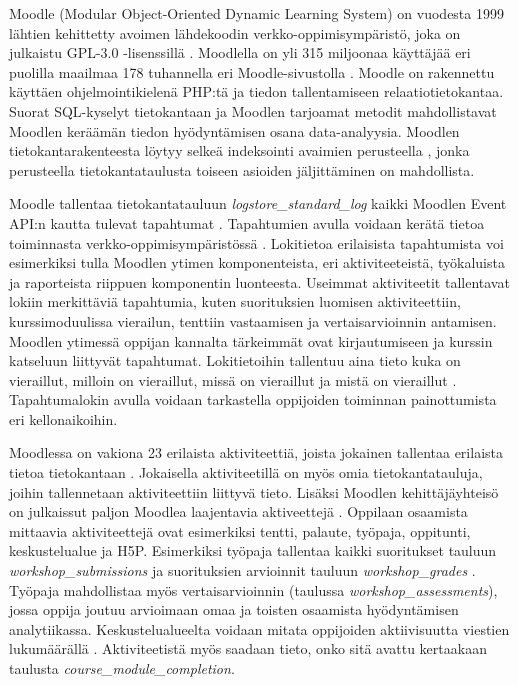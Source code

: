 Moodle (Modular Object-Oriented Dynamic Learning System) on vuodesta 1999 lähtien kehittetty avoimen lähdekoodin verkko-oppimisympäristö, joka on julkaistu GPL-3.0 -lisenssillä \citep{dougiamasPowerOpenEducational2021,dougiamasMoodle2022}. Moodlella on yli 315 miljoonaa käyttäjää eri puolilla maailmaa 178 tuhannella eri Moodle-sivustolla \citep{moodle.orgMoodleStatistics}. Moodle on rakennettu käyttäen ohjelmointikielenä PHP:tä ja tiedon tallentamiseen relaatiotietokantaa. Suorat SQL-kyselyt tietokantaan ja Moodlen tarjoamat metodit mahdollistavat Moodlen keräämän tiedon hyödyntämisen osana data-analyysia. Moodlen tietokantarakenteesta löytyy selkeä indeksointi avaimien perusteella \citep{greenMoodle11Database2022}, jonka perusteella tietokantataulusta toiseen asioiden jäljittäminen on mahdollista.

Moodle tallentaa tietokantatauluun \emph{logstore\_standard\_log} kaikki Moodlen Event API:n kautta tulevat tapahtumat \citep{dougiamasMoodle2022, dougiamasLoggingMoodleDocs2021}. Tapahtumien avulla voidaan kerätä tietoa toiminnasta verkko-oppimisympäristössä \citep{agudo-peregrinaCanWePredict2014}. Lokitietoa erilaisista tapahtumista voi esimerkiksi tulla Moodlen ytimen komponenteista, eri aktiviteeteistä, työkaluista ja raporteista riippuen komponentin luonteesta. Useimmat aktiviteetit tallentavat lokiin merkittäviä tapahtumia, kuten suorituksien luomisen aktiviteettiin, kurssimoduulissa vierailun, tenttiin vastaamisen ja vertaisarvioinnin antamisen. Moodlen ytimessä oppijan kannalta tärkeimmät ovat kirjautumiseen ja kurssin katseluun liittyvät tapahtumat. Lokitietoihin tallentuu aina tieto kuka on vieraillut, milloin on vieraillut, missä on vieraillut ja mistä on vieraillut \citep{abdullahLearningStyleClassification2015}. Tapahtumalokin avulla voidaan tarkastella oppijoiden toiminnan painottumista eri kellonaikoihin.

Moodlessa on vakiona 23 erilaista aktiviteettiä, joista jokainen tallentaa erilaista tietoa tietokantaan \citep{dougiamasMoodle2022}. Jokaisella aktiviteetillä on myös omia tietokantatauluja, joihin tallennetaan aktiviteettiin liittyvä tieto. Lisäksi Moodlen kehittäjäyhteisö on julkaissut paljon Moodlea laajentavia aktiveettejä \citep{moodle.orgMoodlePluginsDirectory2022}. Oppilaan osaamista mittaavia aktiviteettejä ovat esimerkiksi tentti, palaute, työpaja, oppitunti, keskustelualue ja H5P. Esimerkiksi työpaja tallentaa kaikki suoritukset tauluun \emph{workshop\_submissions} ja suorituksien arvioinnit tauluun \emph{workshop\_grades} \citep{greenMoodle11Database2022}. Työpaja mahdollistaa myös vertaisarvioinnin (taulussa \emph{workshop\_assessments}), jossa oppija joutuu arvioimaan omaa ja toisten osaamista hyödyntämisen analytiikassa. Keskustelualueelta voidaan mitata oppijoiden aktiivisuutta viestien lukumäärällä \citep{mwalumbweUsingLearningAnalytics2017}. Aktiviteetistä myös saadaan tieto, onko sitä avattu kertaakaan taulusta \emph{course\_module\_completion}.

